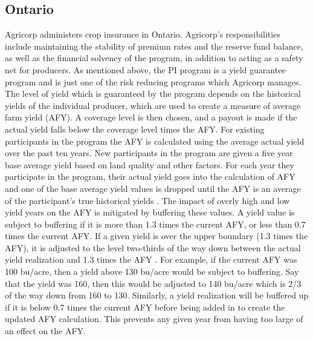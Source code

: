 \subsection{Ontario}

Agricorp administers crop insurance in Ontario. Agricorp's responsibilities include maintaining the stability of premium rates and the reserve fund balance, as well as the financial solvency of the program, in addition to acting as a safety net for producers. As mentioned above, the PI program is a yield guarantee program and is just one of the risk reducing programs which Agricorp manages. The level of yield which is guaranteed by the program depends on the historical yields of the individual producer, which are used to create a measure of average farm yield (AFY).  A coverage level is then chosen, and a payout is made if the actual yield falls below the coverage level times the AFY. For existing participants in the program the AFY is calculated using the average actual yield over the past ten years. New participants in the program are given a five year base average yield based on land quality and other factors. For each year they participate in the program, their actual yield goes into the calculation of AFY and one of the base average yield values is dropped until the AFY is an average of the participant's true historical yields \citep{Agri2014}.  The impact of overly high and low yield years on the AFY is mitigated by buffering these values. A yield value is subject to buffering if it is more than 1.3 times the current AFY, or less than 0.7 times the current AFY. If a given yield is over the upper boundary (1.3 times the AFY), it is adjusted to the level two-thirds of the way down between the actual yield realization and 1.3 times the AFY \citep{Agri2014}. For example, if the current AFY was 100 bu/acre, then a yield above 130 bu/acre would be subject to buffering. Say that the yield was 160, then this would be adjusted to 140 bu/acre which is 2/3 of the way down from 160 to 130. Similarly, a yield realization will be buffered up if it is below 0.7 times the current AFY before being added in to create the updated AFY calculation. This prevents any given year from having too large of an effect on the AFY.
 

